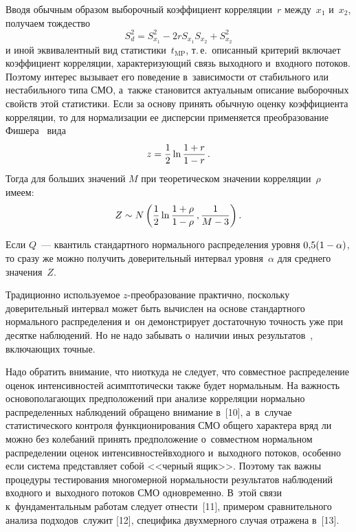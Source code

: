 \begin{multicols}{2}
     \noindent
Вводя обычным образом выборочный коэффициент корреляции~$r$ между~$x_1$ 
и~$x_2$, получаем тож\-дество
$$
S_d^2 =S^2_{x_1} -2r S_{x_1}S_{x_2}+S^2_{x_2}
$$
и иной эквивалентный вид статистики~$t_{\mathrm{MP}}$, т.\,е.\ описанный критерий 
включает коэффициент корреляции, ха\-рак\-те\-ри\-зу\-ющий связь выходного 
и~входного потоков. Поэтому интерес вызывает его поведение в~зависимости от 
стабильного или нестабильного типа СМО, а~так\-же становится актуальным 
описание выборочных свойств этой статистики. Если за основу принять обычную 
оценку коэффициента корреляции, то для нормализации ее дисперсии 
применяется преобразование Фишера~\cite[с.~1375--1385]{8-kri} вида
$$
z=\displaystyle\frac{\displaystyle 1\mathstrut}{\displaystyle 2\mathstrut}\ln \displaystyle\frac{\displaystyle 1+r\mathstrut}{\displaystyle 1-r\mathstrut}\,.
$$
     Тогда для больших значений $M$ при тео\-ре\-ти\-че\-ском значении 
корреляции~$\rho$ имеем:
     $$
     Z\sim N\left( \displaystyle\frac{\displaystyle 1\mathstrut}{\displaystyle 2\mathstrut}\ln\displaystyle\frac{\displaystyle 1+\rho\mathstrut}{\displaystyle 1-\rho\mathstrut}\,, \displaystyle\frac{\displaystyle 1\mathstrut}{\displaystyle M-3\mathstrut}\right).
     $$
     
     Если $Q$~--- квантиль стандартного нормального распределения уровня 
$0{,}5(1\hm- \alpha)$, то сразу же мож\-но получить доверительный интервал 
уров\-ня~$\alpha$ для среднего значения~$Z$. 
     
     Традиционно используемое $z$-пре\-обра\-зо\-ва\-ние практично, поскольку 
доверительный интервал может быть вы\-чис\-лен на основе стандартного 
нормального распределения и~он демонстрирует достаточную точ\-ность уже при 
десятке наблюдений. Но не надо забывать о~наличии иных  
результатов~\cite{9-kri}, включающих точные. 
     
     Надо обратить внимание, что ниоткуда не следует, что совместное 
распределение оценок интенсивностей асимптотически также будет нормальным.\linebreak 
На важность осно\-во\-по\-ла\-га\-ющих предположений при анализе корреляции 
нормально распределенных наблюдений обращено внимание в~[10], а~в~случае 
статистического контроля функционирования СМО общего характера вряд ли 
можно без колебаний принять предположение о~совместном нормальном 
распределении оценок интенсивностей\linebreak входного и~выходного потоков, особенно 
если сис\-те\-ма пред\-став\-ля\-ет собой <<черный ящик>>. Поэтому так важны 
процедуры тестирования многомерной нор\-маль\-ности результатов наблюдений 
\mbox{входного} и~выходного потоков СМО одновременно. В~этой связи 
к~фундаментальным работам следует отнести~[11], примером сравнительного 
анализа подходов~служит [12], специфика двухмерного случая отражена в~[13]. 
     

\end{multicols}
